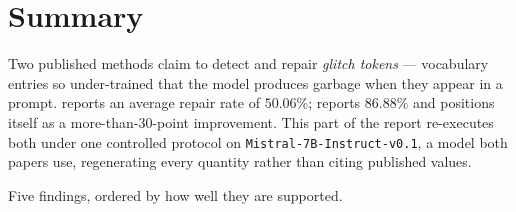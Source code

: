 \maketitle
{\small\tableofcontents}

\section{Summary}
\label{sec:summary}

Two published methods claim to detect and repair \emph{glitch tokens} ---
vocabulary entries so under-trained that the model produces garbage when they
appear in a prompt. \gp{} reports an average repair rate of $50.06\%$; \gc{}
reports $86.88\%$ and positions itself as a more-than-30-point improvement. This
part of the report re-executes both under one controlled protocol on
\texttt{Mistral-7B-Instruct-v0.1}, a model both papers use, regenerating every
quantity rather than citing published values.

Five findings, ordered by how well they are supported.

